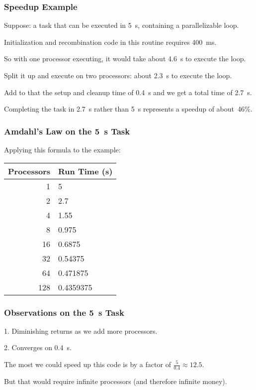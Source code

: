\begin{frame}
\frametitle{Speedup Example}


Suppose: a task that can be executed in 5~s, containing a parallelizable loop.

Initialization and recombination code in this routine requires 400~ms. 

So with one processor executing, it would take about 4.6~s to execute the loop. 

Split it up and execute on two processors: about 2.3~s to execute the loop. 

Add to that the setup and cleanup time of 0.4~s and we get a total time of 2.7~s. 

Completing the task in 2.7~s rather than 5~s represents a speedup of about~46\%.

\end{frame}


\begin{frame}
\frametitle{Amdahl's Law on the 5~s Task}

Applying this formula to the example:

\begin{center}
	\begin{tabular}{r|l}
	\textbf{Processors} & \textbf{Run Time (s)} \\ \hline
	1 & 5\\
	2 & 2.7\\
	4 & 1.55\\
	8 & 0.975\\
	16 & 0.6875 \\
	32 & 0.54375 \\
	64 & 0.471875 \\
	128 & 0.4359375\\
	\end{tabular}
\end{center}

\end{frame}

 
\begin{frame}
\frametitle{Observations on the 5~s Task}

1. Diminishing returns as we add more processors.

2. Converges on 0.4~s.

The most we could speed up this code is by a factor of $\frac{5}{0.4}\approx 12.5$.

But that would require infinite processors (and therefore infinite money).

\end{frame}

